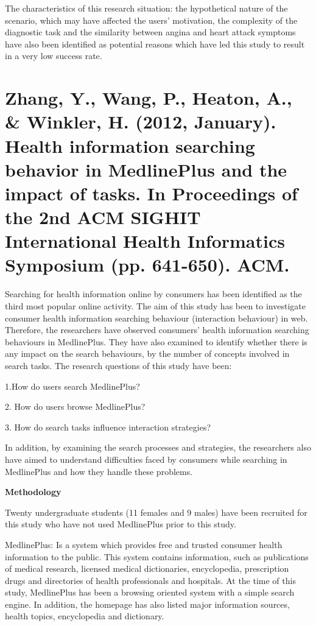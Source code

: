 \documentclass[]{article}
\begin{document}
The characteristics of this research situation: the hypothetical nature of the scenario, which may have affected the users’ motivation, the complexity of the diagnostic task and the similarity between angina and heart attack symptoms have also been identified as potential reasons which have led this study to result in a very low success rate. 

\section{Zhang, Y., Wang, P., Heaton, A., \& Winkler, H. (2012, January). Health information searching behavior in MedlinePlus and the impact of tasks. In Proceedings of the 2nd ACM SIGHIT International Health Informatics Symposium (pp. 641-650). ACM.} 

Searching for health information online by consumers has been identified as the third most popular online activity. The aim of this study has been to investigate consumer health information searching behaviour (interaction behaviour) in web. Therefore, the researchers have observed consumers’ health information searching behaviours in MedlinePlus. They have also examined to identify whether there is any impact on the search behaviours, by the number of concepts involved in search tasks. The research questions of this study have been:

1.How do users search MedlinePlus? 

2. How do users browse MedlinePlus? 

3. How do search tasks influence interaction strategies? 
     
In addition, by examining the search processes and strategies, the researchers also have aimed to understand difficulties faced by consumers while searching in MedlinePlus and how they handle these problems.  

\textbf{Methodology}

Twenty undergraduate students (11 females and 9 males) have been recruited for this study who have not used MedlinePlus prior to this study.

MedlinePlus: Is a system which provides free and trusted consumer health information to the public. This system contains information, such as publications of medical research, licensed medical dictionaries, encyclopedia, prescription drugs and directories of health professionals and hospitals. At the time of this study, MedlinePlus has been a browsing oriented system with a simple search engine. In addition, the homepage has also listed major information sources, health topics, encyclopedia and dictionary.  
\end{document}
